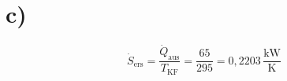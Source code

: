

\section*{c)}
\[
\dot{S}_{\text{ers}} = \frac{\dot{Q}_{\text{aus}}}{T_{\text{KF}}} = \frac{65}{295} = 0{,}2203 \, \frac{\text{kW}}{\text{K}}
\]